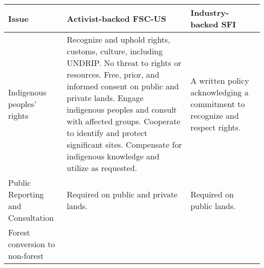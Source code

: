 \begin{table}
\caption{Qualitative Levels of Performance Required for Certification}
\label{issues}
\footnotesize\sf\centering

\begin{longtable}[]{@{}lll@{}}
\toprule
\begin{minipage}[b]{0.20\columnwidth}\raggedright\strut
Issue\strut
\end{minipage} & \begin{minipage}[b]{0.36\columnwidth}\raggedright\strut
Activist-backed FSC-US\strut
\end{minipage} & \begin{minipage}[b]{0.36\columnwidth}\raggedright\strut
Industry-backed SFI\strut
\end{minipage}\tabularnewline
\midrule
\endhead
\begin{minipage}[t]{0.20\columnwidth}\raggedright\strut
Indigenous peoples' rights\strut
\end{minipage} & \begin{minipage}[t]{0.36\columnwidth}\raggedright\strut
Recognize and uphold rights, customs, culture, including UNDRIP. No
threat to rights or resources. Free, prior, and informed consent on
public and private lands. Engage indigenous peoples and consult with
affected groups. Cooperate to identify and protect significant sites.
Compensate for indigenous knowledge and utilize as requested.\strut
\end{minipage} & \begin{minipage}[t]{0.36\columnwidth}\raggedright\strut
A written policy acknowledging a commitment to recognize and respect
rights.\strut
\end{minipage}\tabularnewline
\begin{minipage}[t]{0.20\columnwidth}\raggedright\strut
Public Reporting and Consultation\strut
\end{minipage} & \begin{minipage}[t]{0.36\columnwidth}\raggedright\strut
Required on public and private lands.\strut
\end{minipage} & \begin{minipage}[t]{0.36\columnwidth}\raggedright\strut
Required on public lands.\strut
\end{minipage}\tabularnewline
\begin{minipage}[t]{0.20\columnwidth}\raggedright\strut
Forest conversion to non-forest\strut
\end{minipage} & \begin{minipage}[t]{0.36\columnwidth}\raggedright\strut

\end{minipage}
\end{longtable}
\end{table}
